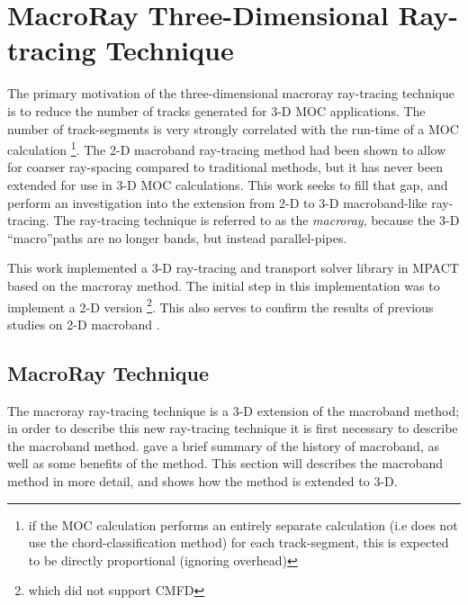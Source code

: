 \chapter{MacroRay Three-Dimensional Ray-tracing Technique}{\label{ch:MacroRay}
  
  
  
  \def\figpath{chapters/MacroRay/figures/}
  \graphicspath{ {\figpath} }

  The primary motivation of the three-dimensional macroray ray-tracing technique is to reduce the number of tracks generated for 3-D \ac{MOC} applications.
  The number of track-segments is very strongly correlated with the run-time of a \ac{MOC} calculation \footnote{if the \ac{MOC} calculation performs an entirely separate calculation (i.e does not use the chord-classification method) for each track-segment, this is expected to be directly proportional (ignoring overhead)}.
  The 2-D macroband ray-tracing method had been shown to allow for coarser ray-spacing compared to traditional methods, but it has never been extended for use in 3-D \ac{MOC} calculations.
  This work seeks to fill that gap, and perform an investigation into the extension from 2-D to 3-D macroband-like ray-tracing.
  The ray-tracing technique is referred to as the \emph{macroray}, because the 3-D ``macro''paths are no longer bands, but instead parallel-pipes.

  This work implemented a 3-D ray-tracing and transport solver library in MPACT based on the macroray method.
  The initial step in this implementation was to implement a 2-D version \footnote{which did not support \ac{CMFD}}.
  This also serves to confirm the results of previous studies on 2-D macroband \cite{Yamamoto2005,Fevotte2007}.

  \section{MacroRay Technique}{\label{sec:MR:MacroRay Technique}
    The macroray ray-tracing technique is a 3-D extension of the macroband method; in order to describe this new ray-tracing technique it is first necessary to describe the macroband method.
     gave a brief summary of the history of macroband, as well as some benefits of the method.
    This section will describes the macroband method in more detail, and shows how the method is extended to 3-D.

}}

